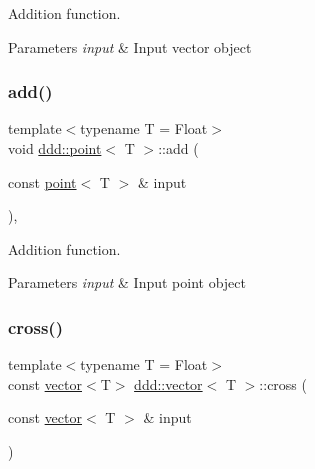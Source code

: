 Addition function. 


\begin{DoxyParams}{Parameters}
{\em input} & Input vector object \\
\hline
\end{DoxyParams}
\mbox{\label{classddd_1_1point_a66ad14a1d50eb4170c874f75b77e8b0b}} 
\subsubsection{\texorpdfstring{add()}{add()}\hspace{0.1cm}{\footnotesize\ttfamily [2/2]}}
{\footnotesize\ttfamily template$<$typename T = Float$>$ \\
void \hyperlink{classddd_1_1point}{ddd\+::point}$<$ T $>$\+::add (\begin{DoxyParamCaption}\item[{const \hyperlink{classddd_1_1point}{point}$<$ T $>$ \&}]{input }\end{DoxyParamCaption})\hspace{0.3cm}{\ttfamily [inline]}, {\ttfamily [inherited]}}



Addition function. 


\begin{DoxyParams}{Parameters}
{\em input} & Input point object \\
\hline
\end{DoxyParams}
\mbox{\label{classddd_1_1vector_a27ac4cb7a469642d497cfe070935ab4b}} 
\subsubsection{\texorpdfstring{cross()}{cross()}}
{\footnotesize\ttfamily template$<$typename T = Float$>$ \\
const \hyperlink{classddd_1_1vector}{vector}$<$T$>$ \hyperlink{classddd_1_1vector}{ddd\+::vector}$<$ T $>$\+::cross (\begin{DoxyParamCaption}\item[{const \hyperlink{classddd_1_1vector}{vector}$<$ T $>$ \&}]{input }\end{DoxyParamCaption})\hspace{0.3cm}{\ttfamily [inline]}}




